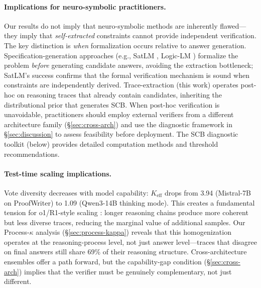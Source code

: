 \paragraph{Implications for neuro-symbolic practitioners.}
Our results do not imply that neuro-symbolic methods are inherently flawed---they imply that \emph{self-extracted} constraints cannot provide independent verification. The key distinction is \emph{when} formalization occurs relative to answer generation. Specification-generation approaches (e.g., SatLM \citep{ye2024satlm}, Logic-LM \citep{pan2023logiclm}) formalize the problem \emph{before} generating candidate answers, avoiding the extraction bottleneck; SatLM's success confirms that the formal verification mechanism is sound when constraints are independently derived. Trace-extraction (this work) operates post-hoc on reasoning traces that already contain candidates, inheriting the distributional prior that generates SCB. When post-hoc verification is unavoidable, practitioners should employ external verifiers from a different architecture family (\S\ref{sec:cross-arch}) and use the diagnostic framework in \S\ref{sec:discussion} to assess feasibility before deployment. The SCB diagnostic toolkit (below) provides detailed computation methods and threshold recommendations.

\paragraph{Test-time scaling implications.}
Vote diversity decreases with model capability: $K_\text{eff}$ drops from 3.94 (Mistral-7B on ProofWriter) to 1.09 (Qwen3-14B thinking mode). This creates a fundamental tension for o1/R1-style scaling \citep{guo2025deepseekr1}: longer reasoning chains produce more coherent but less diverse traces, reducing the marginal value of additional samples. Our Process-$\kappa$ analysis (\S\ref{sec:process-kappa}) reveals that this homogenization operates at the reasoning-process level, not just answer level---traces that disagree on final answers still share 69\% of their reasoning structure. Cross-architecture ensembles offer a path forward, but the capability-gap condition (\S\ref{sec:cross-arch}) implies that the verifier must be genuinely complementary, not just different.

